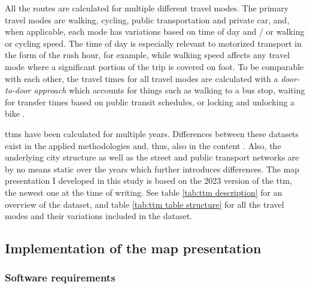 All the routes are calculated for multiple different travel modes.
The primary travel modes are walking, cycling, public transportation and private car,
and, when applicable, each mode has variations based on
time of day and / or walking or cycling speed.
The time of day is especially relevant to motorized transport
in the form of the rush hour, for example,
while walking speed affects any travel mode
where a significant portion of the trip is covered on foot.
To be comparable with each other,
the travel times for all travel modes are
calculated with a \textit{door-to-door approach}
which accounts for things such as walking to a bus stop,
waiting for transfer times based on public transit schedules,
or locking and unlocking a bike \parencite{ten2020}.

\acrshort{ttm}s have been calculated for multiple years.
Differences between these datasets exist in the applied methodologies
and, thus, also in the content \parencite{ten2020}.
Also, the underlying city structure as well as the street and public transport networks
are by no means static over the years
which further introduces differences.
The map presentation I developed in this study
is based on the 2023 version of the \acrshort{ttm},
the newest one at the time of writing.
See table \ref{tab:ttm description} for an overview of the dataset,
and table \ref{tab:ttm table structure} for all the travel modes and
their variations included in the dataset.







\subsection{Implementation of the map presentation}

\subsubsection{Software requirements}


